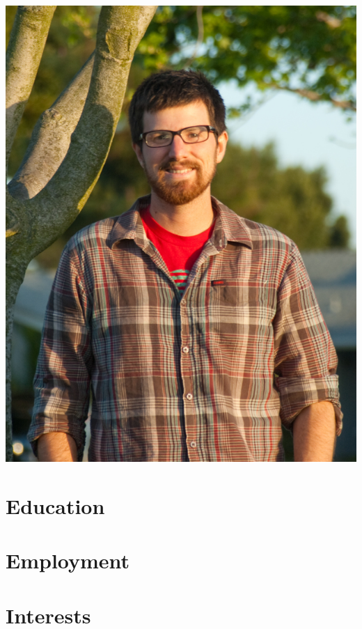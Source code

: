


\thispagestyle{firstpagestyle}
\pagestyle{fancy}

\begin{center}
\vspace{10px}{\Large Patrick Sanan}\\
\end{center}
\vspace{10px}
\begin{minipage}{0.8\textwidth}

\end{minipage}
\begin{minipage}{0.19\textwidth}
  \includegraphics[width=\textwidth]{sanan_patrick_portrait_small.jpg}
\end{minipage}

\section*{Education}


\section*{Employment}


\section*{Interests}


\thispagestyle{lastpagestyle}


